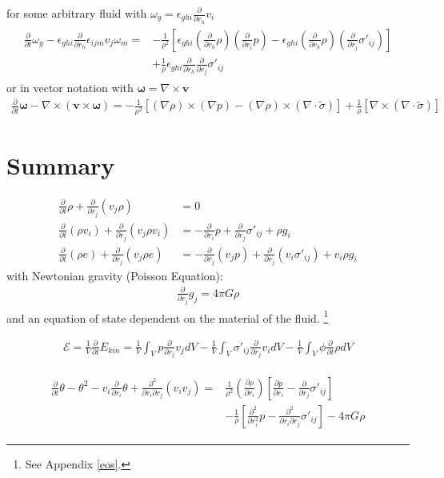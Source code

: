 \documentclass[a4paper,
					fontsize=12pt,
					twoside,
					pagesize,
					cleardoublepage=plain,
					headsepline,
					bibliography=totoc
					]{scrbook}
\renewcommand{\vec}[1]{\boldsymbol{#1}}
\newcommand{\lra}[1]{{ \left( #1 \right) }}
\newcommand{\lrb}[1]{{ \left[ #1 \right] }}
\newcommand{\pd}[1]{\frac{\partial}{\partial #1}}
\newcommand{\ppd}[2]{\frac{\partial #2}{\partial #1}}
\newcommand{\pdd}[1]{\frac{\partial^2}{\partial #1^2}}
\begin{document}
for some arbitrary
fluid with $\omega_g=\epsilon_{ghi}\pd{r_h}v_i$
\begin{align}
\begin{split}
\pd{t}\omega_g
-\epsilon_{ghi}\pd{r_h} \epsilon_{ijm} v_j \omega_m =
&-\frac{1}{\rho^2}\lrb{
\epsilon_{ghi} \lra{\pd{r_h}\rho} \lra{\pd{r_i}p}
-\epsilon_{ghi} \lra{\pd{r_h}\rho} \lra{\pd{r_j}\sigma'_{ij}}}\\
&+\frac{1}{\rho}\epsilon_{ghi}\pd{r_h}\pd{r_j}\sigma'_{ij}
\end{split}
\end{align}
or in vector notation with $\vec{\omega}=\nabla \times \vec{v}$
\begin{align}
\pd{t} \vec{\omega}-\nabla \times (\vec{v} \times \vec{\omega}) = 
-\frac{1}{\rho^2}\lrb{(\nabla \rho) \times(\nabla p)
- (\nabla \rho) \times (\nabla \cdot \tilde{\sigma})}
+\frac{1}{\rho} \lrb{\nabla \times (\nabla \cdot \tilde{\sigma})}
\end{align}

\section{Summary}
\begin{align}
\pd{t}\rho + \pd{r_j}(v_j \rho) &= 0 \label{eq:mass}\\
\pd{t}(\rho v_i) + \pd{r_j}(v_j \rho v_i) &= -\pd{r_i}p + \pd{r_j}\sigma'_{ij}
+\rho g_i 
\label{eq:mom} \\
\pd{t}(\rho e) + \pd{r_j}(v_j \rho e) &= -\pd{r_j}(v_j p) + \pd{r_j}(v_i
\sigma'_{ij}) + v_i \rho g_i
\label{eq:etot}
\end{align}
with Newtonian gravity (Poisson Equation):
\begin{align}
\pd{r_j}g_j=4\pi G \rho
\end{align}
and an equation of state dependent on the material of the fluid.
\footnote{See Appendix \ref{eos}.}

\begin{align}
\mathcal{E} = \frac{1}{V} \pd{t} E_{kin} = 
\frac{1}{V} \int_V p \pd{r_j} v_j dV 
-\frac{1}{V} \int_V \sigma'_{ij}\pd{r_j} v_i dV
-\frac{1}{V} \int_V \phi \pd{t}\rho dV
\label{eq:diss}
\end{align}

\begin{align}
\begin{split}
\pd{t}\theta-\theta^2-v_i\pd{r_i}\theta
+\frac{\partial^2}{\partial r_i \partial r_j}(v_i v_j) =&
\frac{1}{\rho^2}\lra{\ppd{r_i}{\rho}}
\lrb{\ppd{r_i}{p}-\pd{r_j}\sigma'_{ij}}\\
&-\frac{1}{\rho}\lrb{\pdd{r_i}p
-\frac{\partial^2}{\partial r_i \partial r_j}\sigma'_{ij}}
-4\pi G \rho
\end{split}
\label{eq:div}
\end{align}
\end{document}
